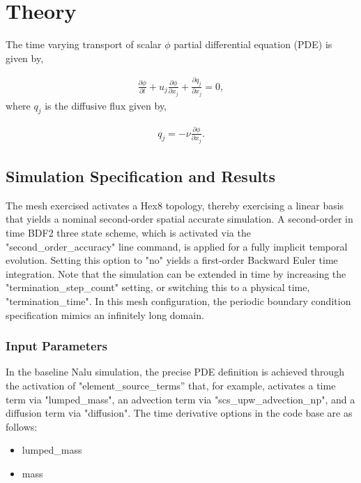 \documentclass{article}
\begin{document}
\section{Theory}
The time varying transport of scalar $\phi$ partial differential equation (PDE) is given by,

\begin{align}
  \frac {\partial \phi }{\partial t} + u_j \frac{ \partial \phi }{\partial x_j} + \frac{\partial q_j}{\partial x_j} = 0,
\label{eq:contEq}
\end{align} 
where $q_j$ is the diffusive flux given by,

\begin{align}
  q_j = -\nu \frac{\partial \phi}{\partial x_j}.
\label{eq:momEq}
\end{align}

\subsection{Simulation Specification and Results}

The mesh exercised activates a Hex8 topology, thereby exercising a
linear basis that yields a nominal second-order spatial accurate
simulation. A second-order in time BDF2 three state scheme, which is activated via the "second\_order\_accuracy" line command, is applied for a fully implicit
temporal evolution. Setting this option to "no" yields a first-order Backward Euler time integration. Note that the simulation can be extended in time by increasing the "termination\_step\_count" setting, or switching this to a physical time, "termination\_time". In this mesh configuration, the periodic boundary condition specification
mimics an infinitely long domain.

\subsubsection{Input Parameters}
In the baseline Nalu simulation, the precise PDE definition is achieved through the activation of  "element\_source\_terms'' that, for example, activates a time term via "lumped\_mass", an advection term via "scs\_upw\_advection\_np", and a diffusion term via "diffusion".
%
The time derivative options in the code base are as follows:
\begin{itemize}
    \item lumped\_mass
    \item mass
\end{itemize}
\end{document}
